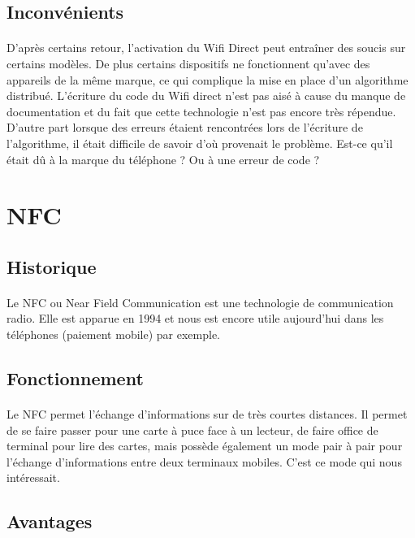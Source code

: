 \documentclass[a4paper,10pt]{report}
\begin{document}
    \subsection{Inconvénients}
    \paragraph{}
    D'après certains retour, l'activation du Wifi Direct peut entraîner des soucis sur certains modèles. De plus certains dispositifs ne fonctionnent qu'avec des appareils de la même marque, ce qui complique la mise en place d'un algorithme distribué.
    L'écriture du code du Wifi direct n'est pas aisé à cause du manque de documentation et du fait que cette technologie n'est pas encore très répendue. D'autre part lorsque des erreurs étaient rencontrées lors de l'écriture de l'algorithme, il était difficile de savoir d'où provenait le problème. Est-ce qu'il était dû à la marque du téléphone ? Ou à une erreur de code ? 
  \section{NFC}
    \subsection{Historique}
     \paragraph{}
     Le NFC ou Near Field Communication est une technologie de communication radio. Elle est apparue en 1994 et nous est encore utile aujourd'hui dans les téléphones (paiement mobile) par exemple. 
    \subsection{Fonctionnement}
     \paragraph{}
     Le NFC permet l'échange d'informations sur de très courtes distances. Il permet de se faire passer pour une carte à puce face à un lecteur, de faire office de terminal pour lire des cartes, mais possède également un mode pair à pair pour l'échange d'informations entre deux terminaux mobiles. C'est ce mode qui nous intéressait.
    \subsection{Avantages}
\end{document}

